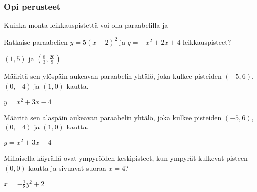 \begin{tehtavasivu}

\subsubsection*{Opi perusteet}

\begin{tehtava}
    Kuinka monta leikkauspistettä voi olla paraabelilla ja
    \begin{alakohdat}
    \end{alakohdat}
    \begin{vastaus}
        \begin{alakohdat}
        \end{alakohdat}
    \end{vastaus}
\end{tehtava}

\begin{tehtava}
Ratkaise paraabelien $y=5(x-2)^2$  ja $y=-x^2+2x+4$ leikkauspisteet?
\begin{vastaus}
$(1, 5)$ ja $(\frac{8}{3}, \frac{20}{9})$
\end{vastaus}
\end{tehtava}

\begin{tehtava}
Määritä sen ylöspäin aukeavan paraabelin yhtälö, joka kulkee pisteiden $(-5, 6)$, $(0, -4)$ ja $(1, 0)$ kautta.
\begin{vastaus}
$y= x^2+3x-4$
\end{vastaus}
\end{tehtava}

\begin{tehtava}
Määritä sen alaspäin aukeavan paraabelin yhtälö, joka kulkee pisteiden $(-5, 6)$, $(0, -4)$ ja $(1, 0)$ kautta.
\begin{vastaus}
$y= x^2+3x-4$
\end{vastaus}
\end{tehtava}

\begin{tehtava}
Millaisella käyrällä ovat ympyröiden keskipisteet, kun ympyrät kulkevat pisteen $(0, 0)$ kautta ja sivuavat suoraa $x=4$?
\begin{vastaus}
$x=-\frac{1}{8}y^2+2$
\end{vastaus}
\end{tehtava}


\end{tehtavasivu}
